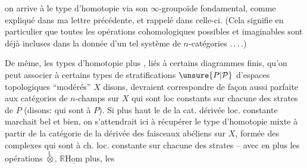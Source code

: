 on arrive à  le type d'homotopie via son $\infty$-groupoïde fondamental, comme expliqué dans ma lettre précédente, et rappelé dans celle-ci. (Cela signifie en particulier que toutes les opérations cohomologiques possibles et imaginables sont déjà incluses dans la donnée d'un tel système de $n$-catégories .\,.\,.\,.) 

De même, les types d'homotopie plus , liés à certains diagrammes finis, qu'on peut associer à certains types de stratifications $\unsure{P|\mathcal{P}}$ d'espaces topologiques ``modérés'' $X$ disons, devraient correspondre de façon aussi parfaite aux catégories de $n$-champs sur $X$ qui sont loc constants sur chacune des strates de $P$ (disons: qui sont  à $P$). Si plus haut le  de la cat. dérivée loc. constante marchait bel et bien, on s'attendrait ici à récupérer le type d'homotopie mixte à partir de la catégorie de la  dérivée des faisceaux abéliens sur $X$, formée des complexes qui sont à ch. loc. constante sur chacune des strates -- avec en plus les opérations $\overset{\mathbb{L}}{\otimes}$, $\mathbb{R}\underline{\mathrm{Hom}}$ plus, les
